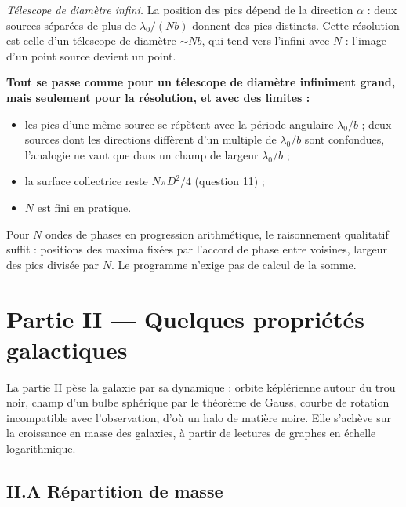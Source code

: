 \documentclass[11pt,a4paper]{article}
\providecommand{\tightlist}{\setlength{\itemsep}{0pt}\setlength{\parskip}{0pt}}
\begin{document}
\emph{Télescope de diamètre infini.} La position des pics dépend de la direction \(\alpha\) : deux sources séparées de plus de \(\lambda_0/(Nb)\) donnent des pics distincts. Cette résolution est celle d'un télescope de diamètre \(\sim Nb\), qui tend vers l'infini avec \(N\) : l'image d'un point source devient un point.

\textbf{Tout se passe comme pour un télescope de diamètre infiniment grand, mais seulement pour la résolution, et avec des limites :}

\begin{itemize}
\tightlist
\item
  les pics d'une même source se répètent avec la période angulaire \(\lambda_0/b\) ; deux sources dont les directions diffèrent d'un multiple de \(\lambda_0/b\) sont confondues, l'analogie ne vaut que dans un champ de largeur \(\lambda_0/b\) ;
\item
  la surface collectrice reste \(N\pi D^2/4\) (question 11) ;
\item
  \(N\) est fini en pratique.
\end{itemize}

\begin{methode}

Pour \(N\) ondes de phases en progression arithmétique, le raisonnement qualitatif suffit : positions des maxima fixées par l'accord de phase entre voisines, largeur des pics divisée par \(N\). Le programme n'exige pas de calcul de la somme.

\end{methode}

\hypertarget{partie-ii-quelques-propriuxe9tuxe9s-galactiques}{%
\section{Partie II --- Quelques propriétés galactiques}\label{partie-ii-quelques-propriuxe9tuxe9s-galactiques}}

La partie II pèse la galaxie par sa dynamique : orbite képlérienne autour du trou noir, champ d'un bulbe sphérique par le théorème de Gauss, courbe de rotation incompatible avec l'observation, d'où un halo de matière noire. Elle s'achève sur la croissance en masse des galaxies, à partir de lectures de graphes en échelle logarithmique.

\hypertarget{ii.a-ruxe9partition-de-masse}{%
\subsection{II.A Répartition de masse}\label{ii.a-ruxe9partition-de-masse}}
\end{document}
